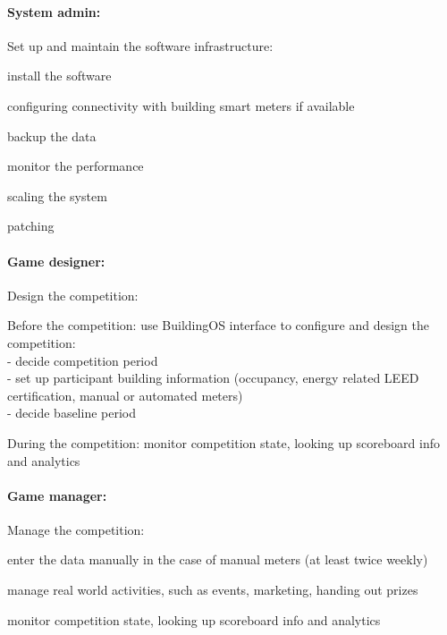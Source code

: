 \documentclass[11pt]{article}
\begin{document}
\paragraph{System admin:} Set up and maintain the software infrastructure:
    \begin{compactitem}
    \item install the software
    \item configuring connectivity with building smart meters if available
    \item backup the data
    \item monitor the performance
    \item scaling the system
    \item patching
    \end{compactitem}
        
\paragraph{Game designer:} Design the competition:
    \begin{compactitem}
    \item Before the competition: use BuildingOS interface to configure and design the competition:\\
        - decide competition period\\
        - set up participant building information (occupancy, energy related LEED certification, manual or automated meters)\\
        - decide baseline period
    
    \item During the competition: monitor competition state, looking up scoreboard info and analytics
    \end{compactitem}

\paragraph{Game manager:} Manage the competition: 
    \begin{compactitem}
    \item enter the data manually in the case of manual meters (at least twice weekly)
    \item manage real world activities, such as events, marketing, handing out prizes
    \item monitor competition state, looking up scoreboard info and analytics
    \end{compactitem}
    
\end{document}

